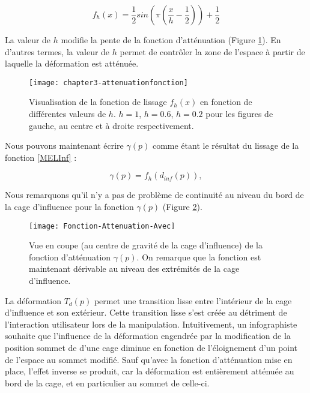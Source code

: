\begin{equation}
  f_h(x) = \frac{1}{2} sin(\pi(\frac{x}{h} - \frac{1}{2})) + \frac{1}{2}
\end{equation}

La valeur de $h$ modifie la pente de la fonction d'atténuation (Figure
\ref{MELFAt}). En d'autres termes, la valeur de $h$ permet de contrôler la
zone de l'espace à partir de laquelle la déformation est atténuée.

\begin{figure}[!ht]
\texttt{[image: chapter3-attenuationfonction]}

\caption[Fonction de lissage $f_h(x)$] {Visualisation de la fonction
de lissage $f_h(x)$ en fonction de différentes valeurs de $h$. $h=1$,
$h=0.6$, $h=0.2$ pour les figures de gauche, au centre et à droite
respectivement.}

\label{MELFAt}
\end{figure}

Nous pouvons maintenant écrire $\gamma(p)$ comme étant le résultat du lissage
de la fonction \ref{MELInf} :

\begin{equation}
  \gamma(p) = f_h(d_{inf}(p)),
\end{equation}

Nous remarquons qu'il n'y a pas de problème de continuité au niveau du bord
de la cage d'influence pour la fonction $\gamma(p)$ (Figure \ref{MELAtL}).

\begin{figure}[!ht]
\texttt{[image: Fonction-Attenuation-Avec]}

\caption[Fonction d'atténuation $\gamma$(p)] {Vue en coupe (au centre de
gravité de la cage d'influence) de la fonction d'atténuation $\gamma(p)$. On
remarque que la fonction est maintenant dérivable au niveau des extrémités de
la cage d'influence.}

\label{MELAtL}
\end{figure}

La déformation $T_d(p)$ permet une transition lisse entre l'intérieur de la
cage d'influence et son extérieur. Cette transition lisse s'est créée au
détriment de l'interaction utilisateur lors de la manipulation. Intuitivement,
un infographiste souhaite que l'influence de la déformation engendrée par la
modification de la position sommet de d'une cage diminue en fonction de
l'éloignement d'un point de l'espace au sommet modifié. Sauf qu'avec la
fonction d'atténuation mise en place, l'effet inverse se produit, car la
déformation est entièrement atténuée au bord de la cage, et en particulier au
sommet de celle-ci.

